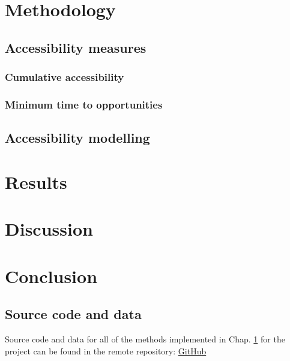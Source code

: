 \documentclass[12pt, a4paper]{report}
\begin{document}
\chapter{Methodology} \label{Chap4}

\section{Accessibility measures}

\subsection{Cumulative accessibility}

\subsection{Minimum time to opportunities}

\section{Accessibility modelling}

\chapter{Results} \label{Chap5}
\chapter{Discussion} \label{Chap6}
\chapter{Conclusion} \label{Chap7}


\renewcommand{\bibname}{References}

%

\begin{appendices}
\chapter{Source code and data} \label{System Requirements}
Source code and data for all of the methods implemented in Chap. \ref{Chap4} for the project can be found in the remote repository: \href{https://github.com/rpoandres/MSc_USS_Dissertation}{GitHub}






\end{appendices}
\clearpage
\printglossaries

\end{document}
